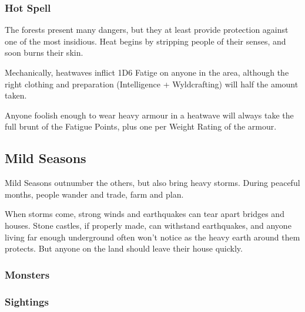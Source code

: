 \begin{multicols}{2}
\subsubsection{Hot Spell}

The forests present many dangers, but they at least provide protection against one of the most insidious.
Heat begins by stripping people of their senses, and soon burns their skin.

Mechanically, heatwaves inflict 1D6 Fatige on anyone in the area, although the right clothing and preparation (Intelligence + Wyldcrafting) will half the amount taken.

Anyone foolish enough to wear heavy armour in a heatwave will always take the full brunt of the Fatigue Points, plus one per Weight Rating of the armour.

\end{multicols}

\bigLine

\begin{multicols}{2}

\subsection{Mild Seasons}

Mild Seasons outnumber the others, but also bring heavy storms.
During peaceful months, people wander and trade, farm and plan.

When storms come, strong winds and earthquakes can tear apart bridges and houses.
Stone castles, if properly made, can withstand earthquakes, and anyone living far enough underground often won't notice as the heavy earth around them protects.
But anyone on the land should leave their house quickly.

\encMildVillages

\encMildEdge

\encMildForest

\begin{multicols}{2}
\subsubsection*{Monsters}
\label{monsterEncounters}

\setcounter{enc}{3}
\begin{dlist}
\end{dlist}

\subsubsection*{Sightings}

\setcounter{track}{2}
\begin{dlist}
\end{dlist}

\end{multicols}

\end{multicols}

